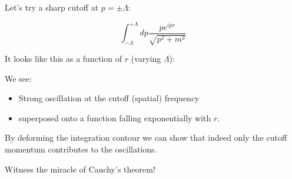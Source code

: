 \documentclass{beamer}
\newcommand{\integrand}{\frac{p e^{ipr}}{\sqrt{p^2 + m^2}}}
\begin{document}


\begin{frame}
Let's try a sharp cutoff at $p = \pm \Lambda$:

$$\int_{-\Lambda}^{+\Lambda} dp \integrand$$

It looks like this as a function of $r$ (varying $\Lambda$):
\end{frame}





\begin{frame}
We see:

\begin{itemize}
\pause
\item Strong \alert{oscillation} at the cutoff (spatial) frequency

\pause
\item superposed onto a function falling \alert{exponentially} with $r$.
\end{itemize}

\pause
By deforming the integration contour we can show that indeed \alert{only}
the cutoff momentum contributes to the oscillations.

\pause
Witness the miracle of \alert{Cauchy's theorem}!
\end{frame}



\end{document}
